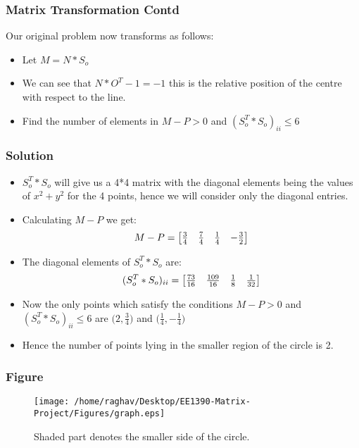 \documentclass{beamer}
\begin{document}
\begin{frame}
\frametitle{Matrix Transformation Contd}
Our original problem now transforms as follows:
\begin{itemize}
 \item<1-> Let $M = N*S_o$ 
 \item<2-> We can see that $N*O^{T} - 1 = -1$ this is the relative position of the centre with respect to the line.
 \item<3-> Find the number of elements in $M-P > 0$ and $(S_o^{T}*S_o)_{ii}\leqslant 6$
\end{itemize}

\end{frame}

\begin{frame}
\frametitle{Solution}
\begin{itemize}
 \item<1-> $S_o^{T}*S_o$ will give us a 4*4 matrix with the diagonal elements being the values of $x^{2} + y^{2}$ for the 4 points, hence we will consider only the diagonal entries. 
 \item<2-> Calculating $M-P$ we get:
 \[
 M-P =
\begin{bmatrix}
    $\(\frac{3}{4}\)$ & $\(\frac{7}{4}\)$ & $\(\frac{1}{4}\)$ & $\(-\frac{3}{2}\)$
\end{bmatrix}
\] 
 \item<3-> The diagonal elements of $S_o^{T}*S_o$ are:
  \[
 (S_o^{T}*S_o)_{ii} =
\begin{bmatrix}
    $\(\frac{73}{16}\)$ & $\(\frac{109}{16}\)$ & $\(\frac{1}{8}\)$ & $\(\frac{1}{32}\)$
\end{bmatrix}
\] 
\item<4-> Now the only points which satisfy the conditions $M-P > 0$ and $(S_o^{T}*S_o)_{ii}\leqslant 6$ are $\bigg(2,$\(\frac{3}{4}\)$\bigg)$ and $\bigg($\(\frac{1}{4}\)$,$\(-\frac{1}{4}\)$\bigg)$
\item<5->Hence the number of points lying in the smaller region of the circle is 2.
\end{itemize}

\end{frame}

\begin{frame}
\frametitle{Figure}
\begin{figure}[h]
\centering
\texttt{[image: /home/raghav/Desktop/EE1390-Matrix-Project/Figures/graph.eps]}
\caption{Shaded part denotes the smaller side of the circle.}
\label{foobar-figure}
\end{figure}

\end{frame}
\end{document}
